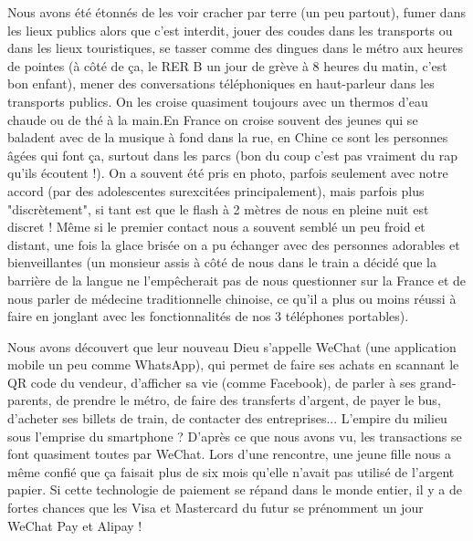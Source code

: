 Nous avons été étonnés de les voir cracher par terre (un peu partout),
fumer dans les lieux publics alors que c'est interdit, jouer des coudes
dans les transports ou dans les lieux touristiques, se tasser comme des
dingues dans le métro aux heures de pointes (à côté de ça, le RER B un
jour de grève à 8 heures du matin, c'est bon enfant), mener des
conversations téléphoniques en haut-parleur dans les transports publics.
On les croise quasiment toujours avec un thermos d'eau chaude ou de thé
à la main.En France on croise souvent des jeunes qui se baladent avec de
la musique à fond dans la rue, en Chine ce sont les personnes âgées qui
font ça, surtout dans les parcs (bon du coup c'est pas vraiment du rap
qu'ils écoutent !). On a souvent été pris en photo, parfois seulement
avec notre accord (par des adolescentes surexcitées principalement),
mais parfois plus "discrètement", si tant est que le flash à 2 mètres de
nous en pleine nuit est discret ! Même si le premier contact nous a
souvent semblé un peu froid et distant, une fois la glace brisée on a pu
échanger avec des personnes adorables et bienveillantes (un monsieur
assis à côté de nous dans le train a décidé que la barrière de la langue
ne l'empêcherait pas de nous questionner sur la France et de nous parler
de médecine traditionnelle chinoise, ce qu'il a plus ou moins réussi à
faire en jonglant avec les fonctionnalités de nos 3 téléphones
portables).

Nous avons découvert que leur nouveau Dieu s'appelle WeChat (une
application mobile un peu comme WhatsApp), qui permet de faire ses
achats en scannant le QR code du vendeur, d'afficher sa vie (comme
Facebook), de parler à ses grand-parents, de prendre le métro, de faire
des transferts d'argent, de payer le bus, d'acheter ses billets de
train, de contacter des entreprises... L'empire du milieu sous l'emprise
du smartphone ? D'après ce que nous avons vu, les transactions se font
quasiment toutes par WeChat. Lors d'une rencontre, une jeune fille nous
a même confié que ça faisait plus de six mois qu'elle n'avait pas
utilisé de l'argent papier. Si cette technologie de paiement se répand
dans le monde entier, il y a de fortes chances que les Visa et
Mastercard du futur se prénomment un jour WeChat Pay et Alipay !

